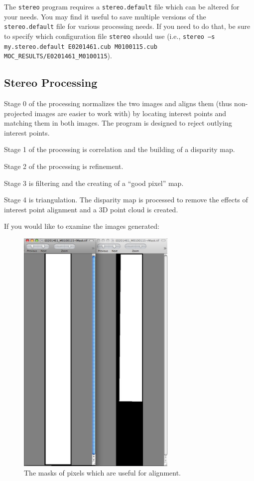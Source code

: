 The \texttt{stereo} program requires a \texttt{stereo.default} file
which can be altered for your needs. You may find it useful to save
multiple versions of the \texttt{stereo.default} file for various
processing needs. If you need to do that, be sure to specify which
configuration file \texttt{stereo} should use (i.e., \texttt{stereo
–s my.stereo.default E0201461.cub M0100115.cub
MOC\_RESULTS/E0201461\_M0100115}).

\subsection*{Stereo Processing}

Stage 0 of the processing normalizes the two images and aligns them
(thus non-projected images are easier to work with) by locating
interest points and matching them in both images. The program is
designed to reject outlying interest points.

Stage 1 of the processing is correlation and the building of a disparity map. 

Stage 2 of the processing is refinement. 

Stage 3 is filtering and the creating of a ``good pixel'' map. 

Stage 4 is triangulation. The disparity map is processed to remove
the effects of interest point alignment and a 3D point cloud is
created.

If you would like to examine the images generated:

\begin{figure}
\begin{center}
\includegraphics[width=3in]{images/p19-masks.png}
\caption[P19 images masks]{
    \label{p19-masks}
	The masks of pixels which are useful for alignment.
    }
\end{center}
\end{figure}

